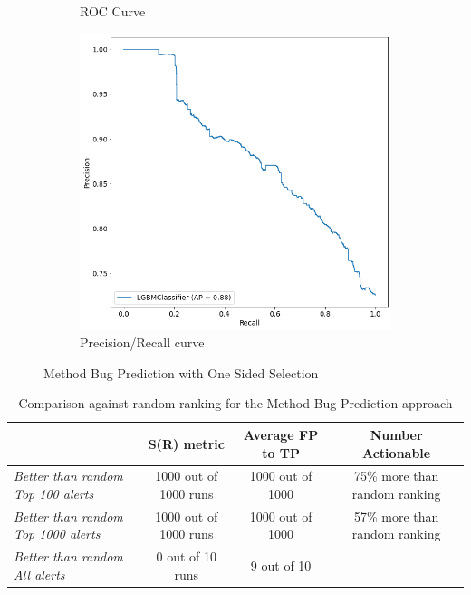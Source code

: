 \begin{figure}[H]
\begin{subfigure}{.5\textwidth}
		\caption{ROC Curve}\label{}
	\end{subfigure}%
	\begin{subfigure}{.5\textwidth}
		\centering
		\includegraphics[scale=0.3]{./src/methodBug/methodbug_onesidedselection_pr.png}
		\caption{Precision/Recall curve}\label{}
	\end{subfigure}  
	\caption{Method Bug Prediction with One Sided Selection}
	\label{results:bugprediction_best}
\end{figure}


\begin{table}[H]
	\caption{Comparison against random ranking for the Method Bug Prediction approach}
	\label{results:ranking_methodbug_alerts}
	\centering
	\begin{tabular}{@{}lccc@{}}
		\toprule
		& \textbf{S(R) metric}  & \textbf{Average FP to TP} & \textbf{Number Actionable}    \\ \midrule
		\textit{Better than random Top 100 alerts}  & 1000 out of 1000 runs & 1000 out of 1000          & 75\% more than random ranking \\
		\textit{Better than random Top 1000 alerts} & 1000 out of 1000 runs & 1000 out of 1000          & 57\% more than random ranking \\
		\textit{Better than random All alerts}      & 0 out of 10 runs      & 9 out of 10               & \multicolumn{1}{l}{}          \\ \bottomrule
	\end{tabular}
\end{table}

